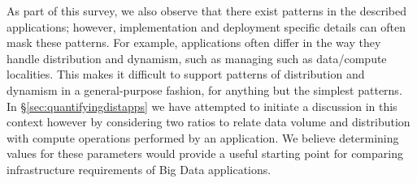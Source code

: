 
As part of this survey, we also observe that there exist patterns in
the described applications; however, implementation and deployment
specific details can often mask these patterns.  For example,
applications often differ in the way they handle distribution and
dynamism, such as managing such as data/compute localities. This makes
it difficult to support patterns of distribution and dynamism in a
general-purpose fashion, for anything but the simplest patterns. In
\S\ref{sec:quantifyingdistapps} we have attempted to initiate a
discussion in this context however by considering two
ratios %
to relate data volume and distribution with compute operations
performed by an application. We believe determining values for these
parameters would provide a useful starting point for comparing
infrastructure requirements of Big Data applications.







